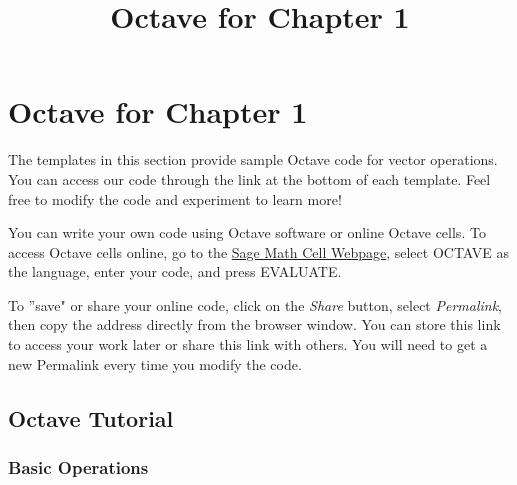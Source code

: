 \documentclass{ximera}
\title{Octave for Chapter 1} \license{CC BY-NC-SA 4.0}
\begin{document}
\begin{abstract}
\end{abstract}
\maketitle
\section*{Octave for Chapter 1}

The templates in this section provide sample Octave code for vector operations. You can access our code through the link at the bottom of each template.  Feel free to modify the code and experiment to learn more!  

You can write your own code using Octave software or online Octave cells.  To access Octave cells online, go to the \href{https://sagecell.sagemath.org/}{Sage Math Cell Webpage}, select OCTAVE as the language, enter your code, and press EVALUATE.  

To ''save" or share your online code, click on the \emph{Share} button, select \emph{Permalink}, then copy the address directly from the browser window.  You can store this link to access your work later or share this link with others.  You will need to get a new Permalink every time you modify the code.

\subsection*{Octave Tutorial}
\subsubsection*{Basic Operations}
\end{document}

